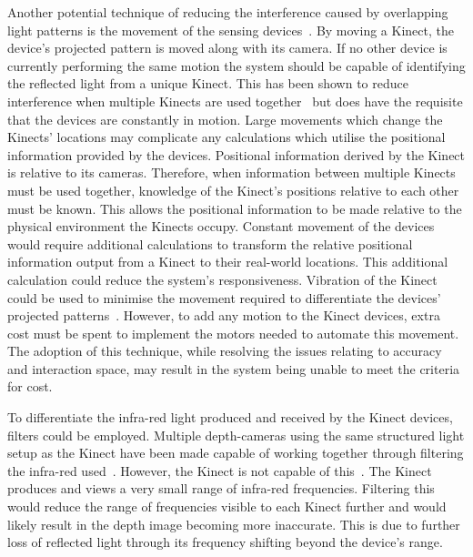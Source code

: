 \documentclass[link]{IWCOMP}
\begin{document}
Another potential technique of reducing the interference caused by overlapping light patterns is the movement of the sensing devices~\cite{Maimone2012}.
By moving a Kinect, the device's projected pattern is moved along with its camera.
If no other device is currently performing the same motion the system should be capable of identifying the reflected light from a unique Kinect.
This has been shown to reduce interference when multiple Kinects are used together~\cite{Maimone2012} but does have the requisite that the devices are constantly in motion.
Large movements which change the Kinects' locations may complicate any calculations which utilise the positional information provided by the devices.
Positional information derived by the Kinect is relative to its cameras.
Therefore, when information between multiple Kinects must be used together, knowledge of the Kinect's positions relative to each other must be known.
This allows the positional information to be made relative to the physical environment the Kinects occupy.
Constant movement of the devices would require additional calculations to transform the relative positional information output from a Kinect to their real-world locations.
This additional calculation could reduce the system's responsiveness.
Vibration of the Kinect could be used to minimise the movement required to differentiate the devices' projected patterns~\cite{Kainz2012}.
However, to add any motion to the Kinect devices, extra cost must be spent to implement the motors needed to automate this movement.
The adoption of this technique, while resolving the issues relating to accuracy and interaction space, may result in the system being unable to meet the criteria for cost.

To differentiate the infra-red light produced and received by the Kinect devices, filters could be employed.
Multiple depth-cameras using the same structured light setup as the Kinect have been made capable of working together through filtering the infra-red used~\cite{Kim2008}.
However, the Kinect is not capable of this~\cite{Kainz2012}.
The Kinect produces and views a very small range of infra-red frequencies.
Filtering this would reduce the range of frequencies visible to each Kinect further and would likely result in the depth image becoming more inaccurate.
This is due to further loss of reflected light through its frequency shifting beyond the device's range.
\end{document}
